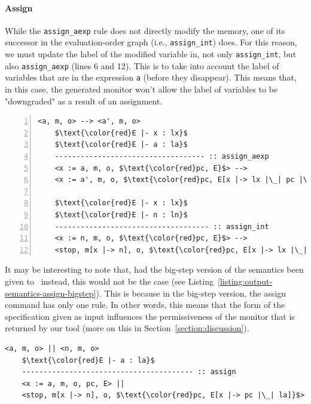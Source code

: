 \documentclass[conference]{IEEEtran}
\begin{document}
\paragraph{Assign}
While the \lstinline{assign_aexp} rule does not directly modify the memory, one of its successor in the evaluation-order graph (i.e., \lstinline{assign_int}) does. For this reason, we must update the label of the modified variable in, not only \lstinline{assign_int}, but also \lstinline{assign_aexp} (lines 6 and 12). This is to take into account the label of variables that are in the expression \lstinline{a} (before they disappear). This means that, in this case, the generated monitor won't allow the label of variables to be "downgraded" as a result of an assignment.
\begin{lstlisting}[label=listing:output-semantics-assign,numbers=left,captionpos=b,caption=Ott-IFC's output for the "assign" command]
	<a, m, o> --> <a', m, o>
	$\text{\color{red}E |- x : lx}$
	$\text{\color{red}E |- a : la}$
	----------------------------------- :: assign_aexp
	<x := a, m, o, $\text{\color{red}pc, E}$> --> 
	<x := a', m, o, $\text{\color{red}pc, E[x |-> lx |\_| pc |\_| la]}$>
	
	$\text{\color{red}E |- x : lx}$
	$\text{\color{red}E |- n : ln}$
	------------------------------------ :: assign_int
	<x := n, m, o, $\text{\color{red}pc, E}$> --> 
	<stop, m[x |-> n], o, $\text{\color{red}pc, E[x |-> lx |\_| pc |\_| ln]}$>
\end{lstlisting}

It may be interesting to note that, had the big-step version of the semantics been given to \ottifc\ instead, this would not be the case (see Listing~\ref{listing:output-semantics-assign-bigstep}). This is because in the big-step version, the assign command has only one rule. In other words, this means that the form of the specification given as input influences the permissiveness of the monitor that is returned by our tool (more on this in Section~\ref{section:discussion}).
\begin{lstlisting}[label=listing:output-semantics-assign-bigstep,captionpos=b,caption=Ott-IFC's output the big-step version of the "assign" command]
	<a, m, o> || <n, m, o>
	$\text{\color{red}E |- a : la}$
	---------------------------------------- :: assign
	<x := a, m, o, pc, E> || 
	<stop, m[x |-> n], o, $\text{\color{red}pc, E[x |-> pc |\_| la]}$>
\end{lstlisting}
\end{document}
